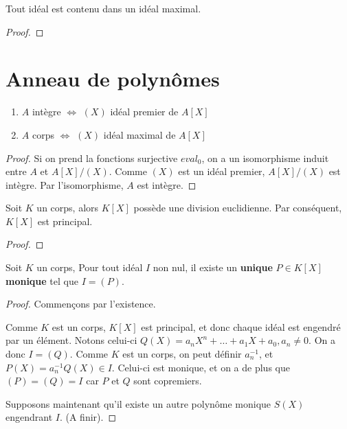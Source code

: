 \begin{theorem}
	Tout idéal est contenu dans un idéal maximal.
\end{theorem}

\ifdefined\outputproof
\begin{proof}

\end{proof}
\fi

\section{Anneau de polynômes}

\begin{proposition}
	\begin{enumerate}
		\item $A$ intègre $\Leftrightarrow$ $(X)$ idéal premier de $A[X]$
		\item $A$ corps $\Leftrightarrow$ $(X)$ idéal maximal de $A[X]$
	\end{enumerate}
\end{proposition}

\ifdefined\outputproof
\begin{proof}
	Si on prend la fonctions surjective $eval_{0}$, on a un isomorphisme induit
	entre $A$ et $A[X]/(X)$. Comme $(X)$ est un idéal premier, $A[X]/(X)$ est
	intègre. Par l'isomorphisme, $A$ est intègre.
\end{proof}
\fi

\begin{proposition}
	Soit $K$ un corps, alors $K[X]$ possède une division euclidienne. Par
	conséquent, $K[X]$ est principal.
\end{proposition}

\ifdefined\outputproof
\begin{proof}
\end{proof}
\fi

\begin{proposition}
	Soit $K$ un corps,
	Pour tout idéal $I$ non nul, il existe un \textbf{unique} $P \in K[X]$
	\textbf{monique} tel que $I = (P)$.
\end{proposition}

\ifdefined\outputproof
\begin{proof}
	Commençons par l'existence.

	Comme $K$ est un corps, $K[X]$ est principal, et donc chaque idéal est
	engendré par un élément. Notons celui-ci $Q(X) = a_{n}X^{n} + \ldots +
	a_{1}X + a_{0}, a_{n} \ne 0$. On a donc $I = (Q)$. Comme $K$ est un corps, on peut
	définir $a_{n}^{-1}$, et $P(X) = a_{n}^{-1}Q(X) \in I$. Celui-ci est
	monique, et on a de plus que $(P) = (Q) = I$ car $P$ et $Q$ sont copremiers.

	Supposons maintenant qu'il existe un autre polynôme monique $S(X)$
	engendrant $I$. (A finir).
\end{proof}
\fi

